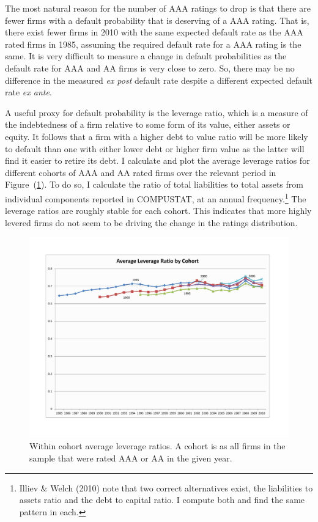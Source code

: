 \documentclass[notitlepage]{article}
\begin{document}
The most natural reason for the number of AAA ratings to drop is that there are fewer firms with a default probability that is deserving of a AAA rating. That is, there exist fewer firms in 2010 with the same expected default rate as the AAA rated firms in 1985, assuming the required default rate for a AAA rating is the same. It is very difficult to measure a change in default probabilities as the default rate for AAA and AA firms is very close to zero. So, there may be no difference in the measured \emph{ex post} default rate despite a different expected default rate \textit{ex ante}. 

A useful proxy for default probability is the leverage ratio, which is a measure of the indebtedness of a firm relative to some form of its value, either assets or equity. It follows that a firm with a higher debt to value ratio will be more likely to default than one with either lower debt or higher firm value as the latter will find it easier to retire its debt. I calculate and plot the average leverage ratios for different cohorts of AAA and AA rated firms over the relevant period in Figure~(\ref{fig:coh_lev}). To do so, I calculate the ratio of total liabilities to total assets from individual components reported in COMPUSTAT, at an annual frequency.\footnote{Illiev \& Welch (2010) note that two correct alternatives exist, the liabilities to assets ratio and the debt to capital ratio. I compute both and find the same pattern in each.} The leverage ratios are roughly stable for each cohort. This indicates that more highly levered firms do not seem to be driving the change in the ratings distribution.

\begin{figure}[ht]
\centering
\includegraphics[width=\textwidth]{leverage_by_cohort_clr.pdf}
\caption{Within cohort average leverage ratios. A cohort is as all firms in the sample that were rated AAA or AA in the given year.}
\label{fig:coh_lev}
\end{figure}
\end{document}
